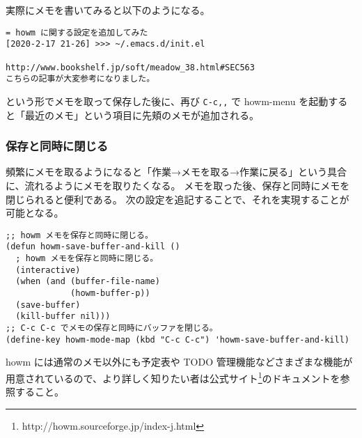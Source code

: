 実際にメモを書いてみると以下のようになる。\enlargethispage{0.50zw}
\begin{mdframed}[roundcorner=0.50zw,leftmargin=3.00zw,rightmargin=3.00zw,skipabove=0.40zw,skipbelow=0.40zw,innertopmargin=4.00pt,innerbottommargin=4.00pt,innerleftmargin=5.00pt,innerrightmargin=5.00pt,linecolor=gray!020,linewidth=0.50pt,backgroundcolor=gray!20]
\begin{verbatim}
= howm に関する設定を追加してみた
[2020-2-17 21-26] >>> ~/.emacs.d/init.el

http://www.bookshelf.jp/soft/meadow_38.html#SEC563
こちらの記事が大変参考になりました。
\end{verbatim}
\end{mdframed}
という形でメモを取って保存した後に、再び \texttt{C-c\hphantom{.},\hphantom{.},} で howm-menu を起動すると「最近のメモ」という項目に先頬のメモが追加される。
\subsubsection{保存と同時に閉じる}
頻繁にメモを取るようになると「作業→メモを取る→作業に戻る」という具合に、流れるようにメモを取りたくなる。
メモを取った後、保存と同時にメモを閉じられると便利である。
次の設定を追記することで、それを実現することが可能となる。
\begin{mdframed}[roundcorner=0.50zw,leftmargin=3.00zw,rightmargin=3.00zw,skipabove=0.40zw,skipbelow=0.40zw,innertopmargin=4.00pt,innerbottommargin=4.00pt,innerleftmargin=5.00pt,innerrightmargin=5.00pt,linecolor=gray!020,linewidth=0.50pt,backgroundcolor=gray!20]
\begin{verbatim}
;; howm メモを保存と同時に閉じる。
(defun howm-save-buffer-and-kill ()
  ; howm メモを保存と同時に閉じる。
  (interactive)
  (when (and (buffer-file-name)
             (howm-buffer-p))
  (save-buffer)
  (kill-buffer nil)))
;; C-c C-c でメモの保存と同時にバッファを閉じる。
(define-key howm-mode-map (kbd "C-c C-c") 'howm-save-buffer-and-kill)
\end{verbatim}
\end{mdframed}
howm には通常のメモ以外にも予定表や TODO 管理機能などさまざまな機能が用意されているので、より詳しく知りたい者は公式サイト\footnote{http://howm.sourceforge.jp/index-j.html}のドキュメントを参照すること。
